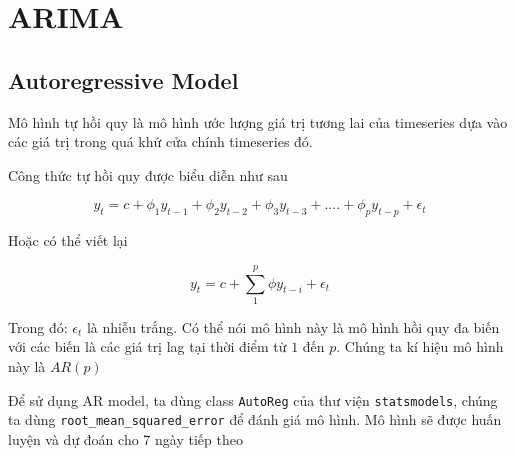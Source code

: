 \documentclass[
]{book}
\begin{document}
\hypertarget{arima}{%
\chapter{ARIMA}\label{arima}}

\hypertarget{autoregressive-model}{%
\section{Autoregressive Model}\label{autoregressive-model}}

Mô hình tự hồi quy là mô hình ước lượng giá trị tương lai của timeseries dựa vào các giá trị trong quá khứ cửa chính timeseries đó.

Công thức tự hồi quy được biểu diễn như sau

\[
y_t = c + \phi_1 y_{t-1} + \phi_2 y_{t-2} + \phi_3 y_{t-3} + .... + \phi_p y_{t-p} + \epsilon_t
\]

Hoặc có thể viết lại

\[
y_t = c + \sum^{p}_{1}\phi y_{t-i} + \epsilon_t
\]

Trong đó: \(\epsilon_t\) là nhiễu trắng. Có thể nói mô hình này là mô hình hồi quy đa biến với các biến là các giá trị lag tại thời điểm từ \(1\) đến \(p\). Chúng ta kí hiệu mô hình này là \(AR(p)\)

Để sử dụng AR model, ta dùng class \texttt{AutoReg} của thư viện \texttt{statsmodels}, chúng ta dùng \texttt{root\_mean\_squared\_error} để đánh giá mô hình. Mô hình sẽ được huấn luyện và dự đoán cho 7 ngày tiếp theo
\end{document}
